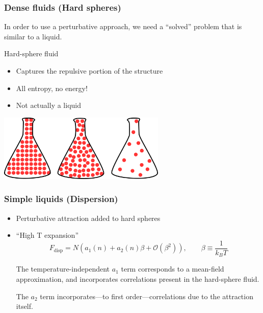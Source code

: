 
\begin{frame}
  \frametitle{Dense fluids (Hard spheres)}
  In order to use a perturbative approach, we need a ``solved''
  problem that is similar to a liquid.
  \begin{block}{Hard-sphere fluid}
    \begin{itemize}
    \item Captures the repulsive portion of the structure
    \item All entropy, no energy!
    \item Not actually a liquid
    \end{itemize}
    \begin{center}
      \includegraphics[width=8cm]{figs/hard-spheres}
    \end{center}
  \end{block}
\end{frame}

\begin{frame}
  \frametitle{Simple liquids (Dispersion)}
  \begin{itemize}
  \item Perturbative attraction added to hard spheres
  \item ``High T expansion''
    \[
    F_\text{disp} = N\left(a_1(n) + a_2(n)\beta + \mathcal{O}(\beta^2)\right),
    \quad \quad \beta \equiv \frac{1}{k_BT}
    \]

    \vspace{1em} The temperature-independent $a_1$ term corresponds to
    a mean-field approximation, and incorporates correlations present
    in the hard-sphere fluid.
    \vspace{1em}

    The $a_2$ term incorporates---to first order---correlations due to
    the attraction itself.
  \end{itemize}
\end{frame}

